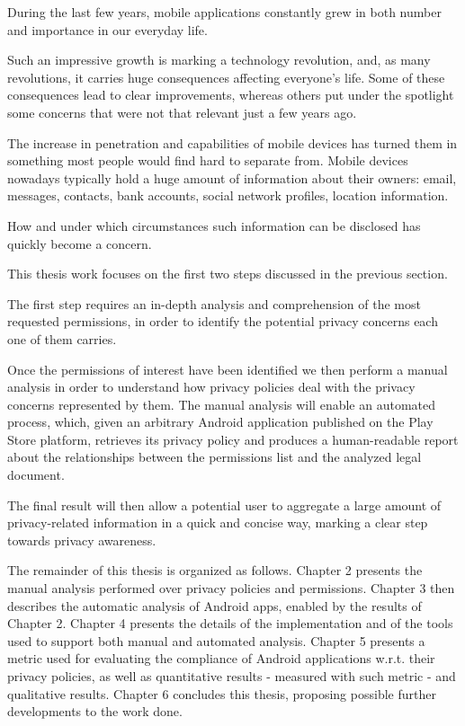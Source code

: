 
During the last few years, mobile applications constantly grew in both number and importance in our everyday life. 


Such an impressive growth is marking a technology revolution, and, as many revolutions, it carries huge consequences affecting everyone's life. Some of these consequences lead to clear improvements, whereas others put under the spotlight some concerns that were not that relevant just a few years ago.

The increase in penetration and capabilities of mobile devices has turned them in something most people would find hard to separate from. Mobile devices nowadays typically hold a huge amount of information about their owners: email, messages, contacts, bank accounts, social network profiles, location information.


How and under which circumstances such information can be disclosed has quickly become a concern.


This thesis work focuses on the first two steps discussed in the previous section.

The first step requires an in-depth analysis and comprehension of the most requested permissions, in order to identify the potential privacy concerns each one of them carries.

Once the permissions of interest have been identified we then perform a manual analysis in order to understand how privacy policies deal with the privacy concerns represented by them. The manual analysis will enable an automated process, which, given an arbitrary Android application published on the Play Store platform, retrieves its privacy policy and produces a human-readable report about the relationships between the permissions list and the analyzed legal document.

The final result will then allow a potential user to aggregate a large amount of privacy-related information in a quick and concise way, marking a clear step towards privacy awareness.


The remainder of this thesis is organized as follows. Chapter 2 presents the manual analysis performed over privacy policies and permissions. Chapter 3 then describes the automatic analysis of Android apps, enabled by the results of Chapter 2. Chapter 4 presents the details of the implementation and of the tools used to support both manual and automated analysis. Chapter 5 presents a metric used for evaluating the compliance of Android applications w.r.t. their privacy policies, as well as quantitative results - measured with such metric - and qualitative results. Chapter 6 concludes this thesis, proposing possible further developments to the work done.